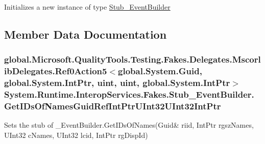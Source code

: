 Initializes a new instance of type \hyperlink{class_system_1_1_runtime_1_1_interop_services_1_1_fakes_1_1_stub___event_builder}{Stub\-\_\-\-Event\-Builder}



\subsection{Member Data Documentation}
\hypertarget{class_system_1_1_runtime_1_1_interop_services_1_1_fakes_1_1_stub___event_builder_ae899931f8a271dd590dda58bdb6e2a8c}{
\subsubsection[{Get\-I\-Ds\-Of\-Names\-Guid\-Ref\-Int\-Ptr\-U\-Int32\-U\-Int32\-Int\-Ptr}]{\setlength{\rightskip}{0pt plus 5cm}global.\-Microsoft.\-Quality\-Tools.\-Testing.\-Fakes.\-Delegates.\-Mscorlib\-Delegates.\-Ref0\-Action5$<$global.\-System.\-Guid, global.\-System.\-Int\-Ptr, uint, uint, global.\-System.\-Int\-Ptr$>$ System.\-Runtime.\-Interop\-Services.\-Fakes.\-Stub\-\_\-\-Event\-Builder.\-Get\-I\-Ds\-Of\-Names\-Guid\-Ref\-Int\-Ptr\-U\-Int32\-U\-Int32\-Int\-Ptr}}\label{class_system_1_1_runtime_1_1_interop_services_1_1_fakes_1_1_stub___event_builder_ae899931f8a271dd590dda58bdb6e2a8c}


Sets the stub of \-\_\-\-Event\-Builder.\-Get\-I\-Ds\-Of\-Names(Guid\& riid, Int\-Ptr rgsz\-Names, U\-Int32 c\-Names, U\-Int32 lcid, Int\-Ptr rg\-Disp\-Id)

